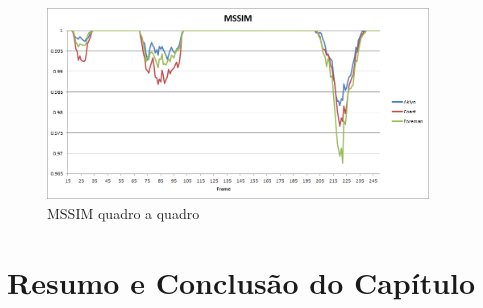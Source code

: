 \begin{figure}[!htb]
	\centering
	\includegraphics[width=0.9\textwidth]{./imgs/mssim.png}
	\caption{MSSIM quadro a quadro}
	\label{fig:mssim}
\end{figure}
\section{Resumo e Conclusão do Capítulo}
